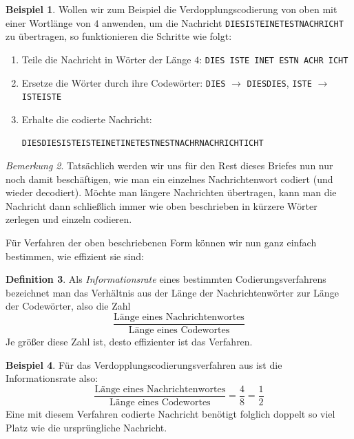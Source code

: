 \documentclass[a4paper,ngerman,12pt]{scrartcl}
\theoremstyle{definition}
\newtheorem{defn}{Definition}[]
\newtheorem{bsp}[defn]{Beispiel}
\theoremstyle{plain}
\theoremstyle{remark}
\newtheorem{bem}[defn]{Bemerkung}
\begin{document}
\begin{bsp}\label{bsp:Verdopplungscodierung}
	Wollen wir zum Beispiel die Verdopplungscodierung von oben mit einer Wortlänge von $4$ anwenden, um die Nachricht \texttt{DIESISTEINETESTNACHRICHT} zu übertragen, so funktionieren die Schritte wie folgt:
	\begin{enumerate}
		\item Teile die Nachricht in Wörter der Länge $4$: \texttt{DIES ISTE INET ESTN ACHR ICHT}
		\item Ersetze die Wörter durch ihre Codewörter: \texttt{DIES} $\rightarrow$ \texttt{DIESDIES}, \texttt{ISTE} $\rightarrow$ \texttt{ISTEISTE}
		\item Erhalte die codierte Nachricht:	
		 \begin{center}
		 	\texttt{DIESDIESISTEISTEINETINETESTNESTNACHRNACHRICHTICHT}
		 \end{center}
	\end{enumerate}
\end{bsp}

\begin{bem}
	Tatsächlich werden wir uns für den Rest dieses Briefes nun nur noch damit beschäftigen, wie man ein einzelnes Nachrichtenwort codiert (und wieder decodiert). Möchte man längere Nachrichten übertragen, kann man die Nachricht dann schließlich immer wie oben beschrieben in kürzere Wörter zerlegen und einzeln codieren.
\end{bem}

Für Verfahren der oben beschriebenen Form können wir nun ganz einfach bestimmen, wie effizient sie sind:

\begin{defn}
	Als \emph{Informationsrate} eines bestimmten Codierungsverfahrens bezeichnet man das Verhältnis aus der Länge der Nachrichtenwörter zur Länge der Codewörter, also die Zahl
		\[\frac{\text{Länge eines Nachrichtenwortes}}{\text{Länge eines Codewortes}}\]
	Je größer diese Zahl ist, desto effizienter ist das Verfahren.
\end{defn}

\begin{bsp}
	Für das Verdopplungscodierungsverfahren aus  ist die Informationsrate also:
		\[\frac{\text{Länge eines Nachrichtenwortes}}{\text{Länge eines Codewortes}} = \frac{4}{8} = \frac{1}{2}\]
	Eine mit diesem Verfahren codierte Nachricht benötigt folglich doppelt so viel Platz wie die ursprüngliche Nachricht.
\end{bsp}
\end{document}
